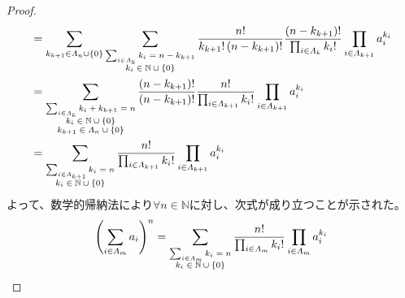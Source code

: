 \documentclass[dvipdfmx]{jsarticle}
\begin{document}
\begin{proof}
\begin{align*}
&= \sum_{k_{k + 1} \in \varLambda_{n} \cup \left\{ 0 \right\}} {\sum_{\scriptsize \begin{matrix} \sum_{i \in \varLambda_{k}} k_{i} = n - k_{k + 1} \\k_{i} \in \mathbb{N} \cup \left\{ 0 \right\} \end{matrix}} {\frac{n!}{k_{k + 1}!\left( n - k_{k + 1} \right)!}\frac{\left( n - k_{k + 1} \right)!}{\prod_{i \in \varLambda_{k}} {k_{i}!}}\prod_{i \in \varLambda_{k + 1}} a_{i}^{k_{i}}}}\\
&= \sum_{\scriptsize \begin{matrix} \sum_{i \in \varLambda_{k}} k_{i} + k_{k + 1} = n \\k_{i} \in \mathbb{N} \cup \left\{ 0 \right\} \\k_{k + 1} \in \varLambda_{n} \cup \left\{ 0 \right\} \end{matrix}} {\frac{\left( n - k_{k + 1} \right)!}{\left( n - k_{k + 1} \right)!}\frac{n!}{\prod_{i \in \varLambda_{k + 1}} {k_{i}!}}\prod_{i \in \varLambda_{k + 1}} a_{i}^{k_{i}}}\\
&= \sum_{\scriptsize \begin{matrix} \sum_{i \in \varLambda_{k + 1}} k_{i} = n \\k_{i} \in \mathbb{N} \cup \left\{ 0 \right\} \end{matrix}} {\frac{n!}{\prod_{i \in \varLambda_{k + 1}} {k_{i}!}}\prod_{i \in \varLambda_{k + 1}} a_{i}^{k_{i}}}
\end{align*}
よって、数学的帰納法により$\forall n \in \mathbb{N}$に対し、次式が成り立つことが示された。
\begin{align*}
\left( \sum_{i \in \varLambda_{m}} a_{i} \right)^{n} = \sum_{\scriptsize \begin{matrix} \sum_{i \in \varLambda_{m}} k_{i} = n \\k_{i} \in \mathbb{N} \cup \left\{ 0 \right\} \end{matrix}} {\frac{n!}{\prod_{i \in \varLambda_{m}} {k_{i}!}}\prod_{i \in \varLambda_{m}} a_{i}^{k_{i}}}
\end{align*}
\end{proof}
\end{document}
